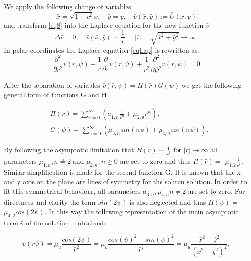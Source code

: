 \documentclass[12pt]{article}
\theoremstyle{theorem}
\theoremstyle{defi}
\begin{document}
We apply the following change of variables
\begin{equation}
\bar{x} = \sqrt{1-c^2}x , \quad  \bar{y} = y, \quad \bar{v}( \bar{x}, \bar{y}) := \bar{U} (x, y)\label{eqVC}
\end{equation}
and transform \eqref{eq8} into the Laplace equation for the new function $\bar{v}$
\begin{equation} \label{eqLap}
\Delta \bar{v} = 0, \quad \bar{v}( \bar{x}, \bar{y}) \sim \frac{1}{\bar{r}}, \quad |\bar{r}|=\sqrt{\bar{x}^2 + \bar{y}^2} \rightarrow \infty.
\end{equation}
In polar coordinates the Laplace equation \eqref{eqLap} is rewritten as:
\begin{equation} \label{eqLapPol}
\frac{\partial^2}{\partial \bar{r}^2} \bar{v}(\bar{r}, \psi) + \frac{1}{\bar{r}} \frac{\partial}{\partial \bar{r}}\bar{v}(\bar{r}, \psi) +  \frac{1}{\bar{r}^2} \frac{\partial^2}{\partial \psi^2} \bar{v}(\bar{r}, \psi) = 0
\end{equation}

After the separation of variables $\bar{v}(\bar{r}, \psi) = H(\bar{r})G(\psi)$  we get the following general form of functions G and H 

\begin{align}
&H(\bar{r}) = \sum^{\infty}_{n=0} (\mu_{1,n} \frac{1}{ \bar{r}^n} + \mu_{2,n} \bar{r}^n ),
\\ \nonumber &G(\psi) = \sum^{\infty}_{n=0} (\mu_{3,n}sin(n \psi ) + \mu_{4,n}cos(n \psi)). \label{eq9}
\end{align}

By following the asymptotic limitation that $H(\bar{r}) \sim \frac{1}{\bar{r}^2} $  for $|\bar{r}| \rightarrow \infty $ all parameters $\mu_{1,n}, n \neq 2$ and $\mu_{2,n},  n \geq 0$  are set to zero  and thus $H(\bar{r}) =$ $\mu_{1,2} \frac{1}{ \bar{r}^2 }$.
Similar simplification is made for the second function G. It is known that the x and y axis on the plane are lines of symmetry for the soliton solution. In order to fit this symmetrical behaviour, all parameters $\mu_{3,n},\mu_{4,n}  n \neq 2$  are set to zero. For directness and clarity the term $sin(2\psi)$ is also neglected and thus $H(\psi) = $ $\mu_{4,2} cos(2 \psi)$. In this way the following representation of the main asymptotic term $\bar{v}$ of the solution is obtained:

\begin{equation}
\bar{v}(\bar{r} \psi) = \mu_u \frac{cos(2 \psi)}{ \bar{r}^2 } = 
 \mu_u \frac{cos(\psi) ^ 2 - sin(\psi)^2}{ \bar{r}^2 } = 
 \mu_u \frac{\bar{x}  ^ 2 - \bar{y}  ^ 2}{( \bar{x}  ^ 2 + \bar{y}  ^ 2)^2 } , \label{eq10}
\end{equation}
\end{document}
